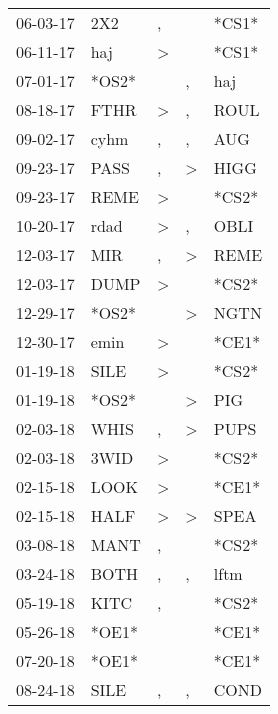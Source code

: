 \begin{supertabular}{lllll}
 06-03-17 &    2X2 &                , &                  &  *CS1* \\
 06-11-17 &    haj &     \textgreater &                  &  *CS1* \\
 07-01-17 &  *OS2* &                  &                , &    haj \\
 08-18-17 &   FTHR &     \textgreater &                , &   ROUL \\
 09-02-17 &   cyhm &                , &                , &    AUG \\
 09-23-17 &   PASS &                , &     \textgreater &   HIGG \\
 09-23-17 &   REME &     \textgreater &                  &  *CS2* \\
 10-20-17 &   rdad &     \textgreater &                , &   OBLI \\
 12-03-17 &    MIR &                , &     \textgreater &   REME \\
 12-03-17 &   DUMP &     \textgreater &                  &  *CS2* \\
 12-29-17 &  *OS2* &                  &     \textgreater &   NGTN \\
 12-30-17 &   emin &     \textgreater &                  &  *CE1* \\
 01-19-18 &   SILE &     \textgreater &                  &  *CS2* \\
 01-19-18 &  *OS2* &                  &     \textgreater &    PIG \\
 02-03-18 &   WHIS &                , &     \textgreater &   PUPS \\
 02-03-18 &   3WID &     \textgreater &                  &  *CS2* \\
 02-15-18 &   LOOK &     \textgreater &                  &  *CE1* \\
 02-15-18 &   HALF &     \textgreater &     \textgreater &   SPEA \\
 03-08-18 &   MANT &                , &                  &  *CS2* \\
 03-24-18 &   BOTH &                , &                , &   lftm \\
 05-19-18 &   KITC &                , &                  &  *CS2* \\
 05-26-18 &  *OE1* &                  &                  &  *CE1* \\
 07-20-18 &  *OE1* &                  &                  &  *CE1* \\
 08-24-18 &   SILE &                , &                , &   COND \\

\end{supertabular}
